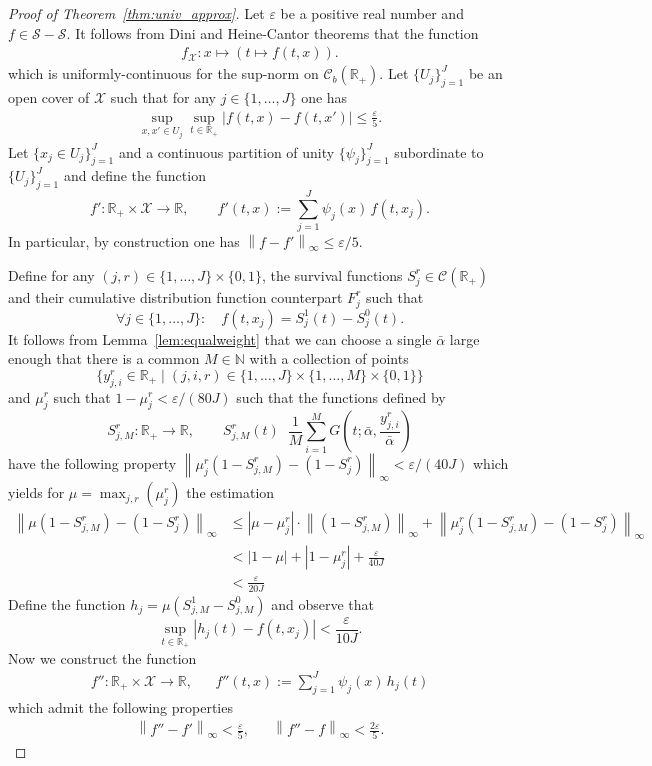 \documentclass{article}
\DeclareMathOperator*{\eqdef }{\,\stackrel{\text{def}}{=}\,}
\newcommand{\abs}[1]{\left\lvert #1 \right\rvert}
\newcommand{\norm}[1]{\left\lVert#1\right\rVert}
\newcommand{\R}{\mathbb{R}}
\begin{document}
\begin{proof}[Proof of Theorem~\ref{thm:univ_approx}]
Let $\varepsilon$ be a positive real number and $f \in \mathcal{S} - \mathcal{S}$. It follows from Dini and Heine-Cantor theorems that the function
\begin{align*}
 f_\mathcal{X} : x \mapsto (t \mapsto f(t,x)).
\end{align*}
which is uniformly-continuous for the sup-norm on $\mathcal{C}_b(\R_+)$.
Let $\{U_j\}_{j=1}^J$ be an open cover of $\mathcal X$ such that for any $j \in \{1,\ldots,J\}$ one has
\begin{align*}
\sup_{x,x' \in U_j} \sup_{t \in \R_{+}} \abs{f(t,x)-f(t,x')}\le \frac{\varepsilon}{5}.
\end{align*}
Let $\{ x_j \in U_j \}_{j=1}^J$ and a continuous partition of unity $\{ \psi_j\}_{j=1}^J$ subordinate to $\{ U_j\}_{j=1}^J$ and define the function
\[ f': \R_{+} \times \mathcal{X} \to \R, \quad \quad  f'(t,x):=\sum_{j=1}^J \psi_j(x)\,f(t,x_j).\]
In particular, by construction one has $\norm{f-f'}_\infty\le \varepsilon/5$.

\medskip

Define for any $(j,r) \in \{1,\ldots,J\} \times \{0,1\}$, the survival functions $S_j^r \in \mathcal{C}(\R_+)$ and their cumulative distribution function counterpart $F_j^r$ such that
\[ \forall j \in \{1, \ldots, J\}: \quad f(t,x_j)=S_j^1(t)-S_j^0(t) .\]
It follows from Lemma~\ref{lem:equalweight} that we can choose a single $\bar\alpha$ large enough that
there is a common $M\in\mathbb N$ with a collection of points
\[ \Big\{ y_{j,i}^r \in \R_{+} \mid (j,i,r) \in \{1,\ldots, J\}\times\{1,\ldots, M\} \times \{0,1\} \Big\}\]
and $\mu_j^r$ such that $1-\mu_j^r <  \varepsilon / (80J) $  such that the functions defined by
\[ S_{j,M}^r : \R_{+} \to \R, \quad \quad S_{j,M}^r(t)\eqdef\frac1M\sum_{i=1}^M G\!\left(t;\bar\alpha,\frac{y_{j,i}^r}{\bar\alpha}\right)\]
have the following property $ \norm{\mu_j^r (1-S_{j,M}^r) - (1 - S_j^r)}_\infty < \varepsilon / (40J)$ which yields for $\mu = \max_{j,r}(\mu_j^r)$ the estimation
\begin{align*}
\norm{\mu (1-S_{j,M}^r) - (1 - S_j^r)}_\infty &\leq |\mu - \mu_j^r| \cdot \norm{(1-S_{j,M}^r)}_\infty +  \norm{\mu_j^r (1-S_{j,M}^r) - (1 - S_j^r)}_\infty\\
&< |1-\mu| + |1-\mu_j^r| +  \frac{\varepsilon}{40J}\\
&< \frac{\varepsilon}{20J}
\end{align*}
Define the function $h_j = \mu (S_{j,M}^1 -  S_{j,M}^0)$
and observe that
\[\sup_{t \in \R_+} |h_j(t) - f(t,x_j)| < \frac{\varepsilon}{10J}.\]
Now we construct the function
\begin{align*}
 f'': \R_{+} \times \mathcal{X} \to \R, &&  f''(t,x):=\sum_{j=1}^J \psi_j(x)\,h_j(t)
\end{align*}
which admit the following properties
\begin{align*}
\norm{f''-f'}_\infty< \frac{\varepsilon}{5}, && \norm{f''-f}_\infty< \frac{2\varepsilon}{5}.
\end{align*}


\end{proof}
\end{document}
